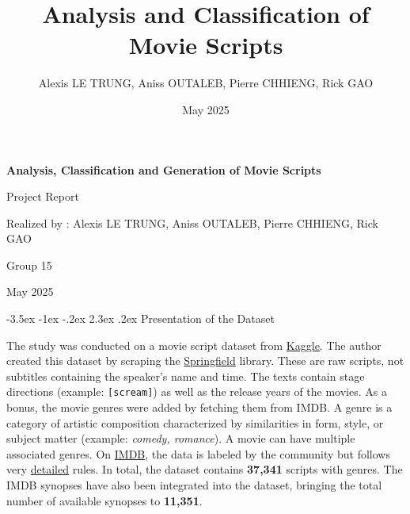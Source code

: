 \documentclass[12pt]{report}
\title{Analysis and Classification of Movie Scripts}
\author{Alexis LE TRUNG, Aniss OUTALEB, Pierre CHHIENG, Rick GAO}
\date{May 2025}
\makeatletter
\renewcommand{\chapter}{\@startsection{chapter}{0}{\z@}
  {-3.5ex \@plus -1ex \@minus -.2ex}
  {2.3ex \@plus.2ex}
  {\normalfont\LARGE\bfseries}}
\makeatother
\begin{document}
\begin{titlepage}
    \begin{center}
        \vspace*{\fill}

        {\Huge\bfseries Analysis, Classification and Generation of Movie Scripts \par}

        \vspace{2cm}

        {\Large Project Report \par}

        \vspace{1.5cm}

        {\large Realized by : Alexis LE TRUNG, Aniss OUTALEB, Pierre CHHIENG, Rick GAO \par}
        {\large Group 15\par}

        \vspace*{\fill}

        {\large May 2025 \par}
    \end{center}
\end{titlepage}



\tableofcontents
\newpage

\chapter{Presentation of the Dataset}

The study was conducted on a movie script dataset from \href{https://www.kaggle.com/datasets/bwandowando/40k-movie-scripts-from-springfield-springfield}{Kaggle}. The author created this dataset by scraping the \href{https://www.springfieldspringfield.co.uk/}{Springfield} library. These are raw scripts, not subtitles containing the speaker's name and time. The texts contain stage directions (example:  \texttt{[scream]}) as well as the release years of the movies. As a bonus, the movie genres were added by fetching them from IMDB. A genre is a category of artistic composition characterized by similarities in form, style, or subject matter (example: \textit{comedy, romance}). A movie can have multiple associated genres. On \href{https://www.imdb.com/}{IMDB}, the data is labeled by the community but follows very \href{https://help.imdb.com/article/contribution/titles/genres/GZDRMS6R742JRGAG#}{detailed} rules. In total, the dataset contains \textbf{37,341} scripts with genres. The IMDB synopses have also been integrated into the dataset, bringing the total number of available synopses to \textbf{11,351}.
\end{document}
